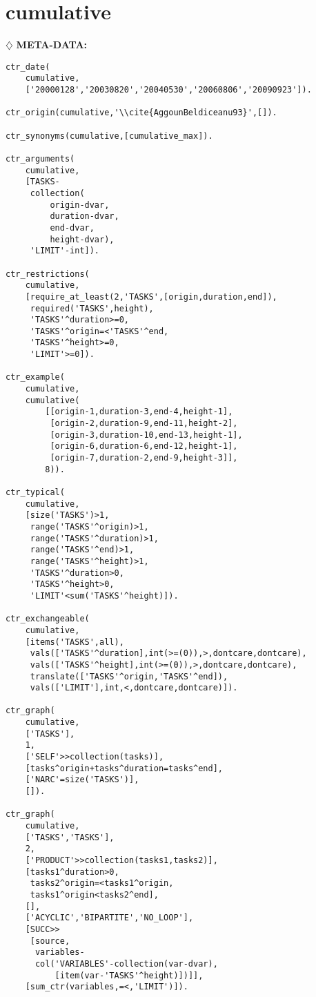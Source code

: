 \clearpage
\section{cumulative}
\hyperlink{Ccumulative}{$\diamondsuit$}\hspace{2mm}\textbf{ \large{M}\small{ETA}\large{-D}\small{ATA}:}
\begin{verbatim}
ctr_date(
    cumulative,
    ['20000128','20030820','20040530','20060806','20090923']).

ctr_origin(cumulative,'\\cite{AggounBeldiceanu93}',[]).

ctr_synonyms(cumulative,[cumulative_max]).

ctr_arguments(
    cumulative,
    [TASKS-
     collection(
         origin-dvar,
         duration-dvar,
         end-dvar,
         height-dvar),
     'LIMIT'-int]).

ctr_restrictions(
    cumulative,
    [require_at_least(2,'TASKS',[origin,duration,end]),
     required('TASKS',height),
     'TASKS'^duration>=0,
     'TASKS'^origin=<'TASKS'^end,
     'TASKS'^height>=0,
     'LIMIT'>=0]).

ctr_example(
    cumulative,
    cumulative(
        [[origin-1,duration-3,end-4,height-1],
         [origin-2,duration-9,end-11,height-2],
         [origin-3,duration-10,end-13,height-1],
         [origin-6,duration-6,end-12,height-1],
         [origin-7,duration-2,end-9,height-3]],
        8)).

ctr_typical(
    cumulative,
    [size('TASKS')>1,
     range('TASKS'^origin)>1,
     range('TASKS'^duration)>1,
     range('TASKS'^end)>1,
     range('TASKS'^height)>1,
     'TASKS'^duration>0,
     'TASKS'^height>0,
     'LIMIT'<sum('TASKS'^height)]).

ctr_exchangeable(
    cumulative,
    [items('TASKS',all),
     vals(['TASKS'^duration],int(>=(0)),>,dontcare,dontcare),
     vals(['TASKS'^height],int(>=(0)),>,dontcare,dontcare),
     translate(['TASKS'^origin,'TASKS'^end]),
     vals(['LIMIT'],int,<,dontcare,dontcare)]).

ctr_graph(
    cumulative,
    ['TASKS'],
    1,
    ['SELF'>>collection(tasks)],
    [tasks^origin+tasks^duration=tasks^end],
    ['NARC'=size('TASKS')],
    []).

ctr_graph(
    cumulative,
    ['TASKS','TASKS'],
    2,
    ['PRODUCT'>>collection(tasks1,tasks2)],
    [tasks1^duration>0,
     tasks2^origin=<tasks1^origin,
     tasks1^origin<tasks2^end],
    [],
    ['ACYCLIC','BIPARTITE','NO_LOOP'],
    [SUCC>>
     [source,
      variables-
      col('VARIABLES'-collection(var-dvar),
          [item(var-'TASKS'^height)])]],
    [sum_ctr(variables,=<,'LIMIT')]).


\end{verbatim}
